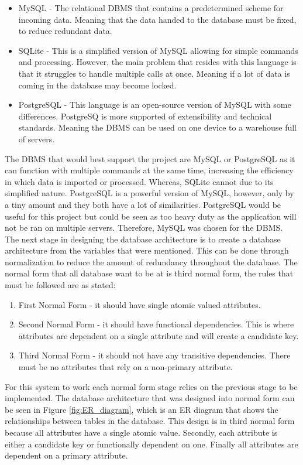 \documentclass{report}
\begin{document}
\begin{itemize}
    \item MySQL \cite{MySQL} - The relational DBMS that contains a predetermined scheme for incoming data. Meaning that the data handed to the database must be fixed, to reduce redundant data.
    \item SQLite\cite{SQLite} - This is a simplified version of MySQL allowing for simple commands and processing. However, the main problem that resides with this language is that it struggles to handle multiple calls at once. Meaning if a lot of data is coming in the database may become locked.
    \item PostgreSQL\cite{PostgreSQL} - This language is an open-source version of MySQL with some differences. PostgreSQ is more supported of extensibility  and technical standards. Meaning the DBMS can be used on one device to a warehouse full of servers. 
\end{itemize}
The DBMS that would best support the project are MySQL or PostgreSQL as it can function with multiple commands at the same time, increasing the efficiency in which data is imported or processed. Whereas, SQLite cannot due to its simplified nature. PostgreSQL is a powerful version of MySQL, however, only by a tiny amount and they both have a lot of similarities\cite{PostSQLvsMySQL}. PostgreSQL would be useful for this project but could be seen as too heavy duty as the application will not be ran on multiple servers. Therefore, MySQL was chosen for the DBMS.\\ \newline
The next stage in designing the database architecture is to create a database architecture from the variables that were mentioned. This can be done through normalization\cite{Normalization} to reduce the amount of redundancy throughout the database. The normal form that all database want to be at is third normal form, the rules that must be followed are as stated:
\begin{enumerate}
    \item First Normal Form - it should have single atomic valued attributes.
    \item Second Normal Form - it should have functional dependencies. This is where attributes are dependent on a single attribute and will create a candidate key.
    \item Third Normal Form -  it should not have any transitive dependencies. There must be no attributes that rely on a non-primary attribute. 
\end{enumerate}{}
For this system to work each normal form stage relies on the previous stage to be implemented. The database architecture that was designed into normal form can be seen in Figure \ref{fig:ER_diagram}, which is an ER diagram that shows the relationships between tables in the database. This design is in third normal form because all attributes have a single atomic value. Secondly, each attribute is either a candidate key or functionally dependent on one. Finally all attributes are dependent on a primary attribute. \\ \newline 
\end{document}

